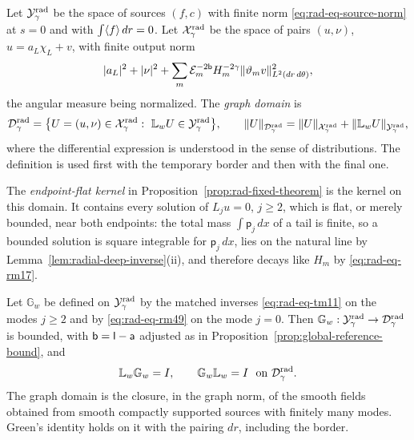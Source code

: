 \begin{definition}
\label{def:radial-graph-domain}
Let $\mathcal Y_\gamma^{\rm rad}$ be the space of sources $(f,c)$ with
finite norm \eqref{eq:rad-eq-source-norm} at $s=0$ and with
$\int\langle f\rangle\,dr=0$. Let $\mathcal X_\gamma^{\rm rad}$ be the space of
pairs $(u,\nu)$, $u=a_L\chi_L+v$, with finite output norm
\[
 |a_L|^2+|\nu|^2+
 \sum_m\mathcal E_m^{-2\mathsf b}H_m^{-2\gamma}
               \|\vartheta_mv\|_{L^2(dr\,d\theta)}^2 ,
\]
the angular measure being normalized. The \emph{graph domain} is
\[
 \mathcal D_\gamma^{\rm rad}
 =\bigl\{U=(u,\nu)\in\mathcal X_\gamma^{\rm rad}:\
          \mathbb L_wU\in\mathcal Y_\gamma^{\rm rad}\bigr\},
 \qquad
 \|U\|_{\mathcal D_\gamma^{\rm rad}}
   =\|U\|_{\mathcal X_\gamma^{\rm rad}}
        +\|\mathbb L_wU\|_{\mathcal Y_\gamma^{\rm rad}} ,
\]
where the differential expression is understood in the sense of
distributions. The definition is used first with the temporary border
and then with the final one.
\end{definition}

The \emph{endpoint-flat kernel} in
Proposition~\ref{prop:rad-fixed-theorem} is the kernel on this domain.
It contains every solution of $L_ju=0$, $j\ge2$, which is flat, or
merely bounded, near both endpoints: the total mass
$\int\mathsf p_j\,dx$ of a tail is finite, so a bounded solution is
square integrable for $\mathsf p_j\,dx$, lies on the natural line by
Lemma~\ref{lem:radial-deep-inverse}(ii), and therefore decays like
$H_m$ by \eqref{eq:rad-eq-rm17}.

\begin{lemma}
\label{lem:rad-green-completion}
Let $\mathbb G_w$ be defined on $\mathcal Y_\gamma^{\rm rad}$ by the
matched inverses \eqref{eq:rad-eq-tm11} on the modes $j\ge2$ and by
\eqref{eq:rad-eq-rm49} on the mode $j=0$. Then
$\mathbb G_w:\mathcal Y_\gamma^{\rm rad}\to\mathcal D_\gamma^{\rm rad}$
is bounded, with $\mathsf b=\mathsf l-\mathsf a$ adjusted as in
Proposition~\ref{prop:global-reference-bound}, and
\begin{equation}\label{eq:rad-reference-piecewise-left-identity}
 \mathbb L_w\mathbb G_w=I,\qquad
 \mathbb G_w\mathbb L_w=I\ \text{ on }\mathcal D_\gamma^{\rm rad}.
\end{equation}
The graph domain is the closure, in the graph norm, of the smooth
fields obtained from smooth compactly supported sources with finitely
many modes. Green's identity holds on it with the pairing $dr$,
including the border.
\end{lemma}

